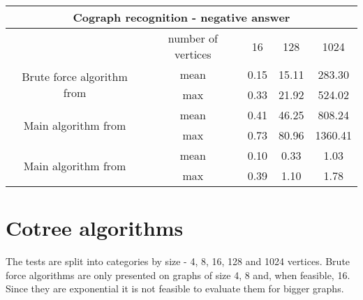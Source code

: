 \begin{center}

    \begin{tabular}{ |c|c|c|c|c|}
        \hline
        \multicolumn{5}{|c|}{Cograph recognition - negative answer}                                            \\
        \hline
                                                                 & number of vertices & 16   & 128   & 1024    \\
        \hline
        \multirow{2}{*}{Brute force algorithm from \cite{habib}} & mean               & 0.15 & 15.11 & 283.30  \\
                                                                 & max                & 0.33 & 21.92 & 524.02  \\
        \hline
        \multirow{2}{*}{Main algorithm from \cite{habib}}        & mean               & 0.41 & 46.25 & 808.24  \\
                                                                 & max                & 0.73 & 80.96 & 1360.41 \\
        \hline
        \multirow{2}{*}{Main algorithm from \cite{corneil}}      & mean               & 0.10 & 0.33  & 1.03    \\
                                                                 & max                & 0.39 & 1.10  & 1.78    \\

        \hline
    \end{tabular}
\end{center}

\section{Cotree algorithms}

The tests are split into categories by size - 4, 8, 16, 128 and 1024  vertices. Brute force algorithms are only presented on graphs of size 4, 8 and, when feasible, 16. Since they are exponential it is not feasible to evaluate them for bigger graphs.

